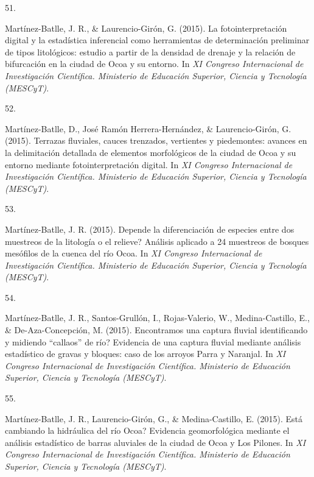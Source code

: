 \documentclass[10pt,a4paper,]{article}
\newlength{\cslhangindent}
\newlength{\csllabelwidth}
\newcommand{\CSLLeftMargin}[1]{\parbox[t]{\csllabelwidth}{\hfill #1~}}
\newcommand{\CSLRightInline}[1]{\parbox[t]{\linewidth - \cslhangindent - \csllabelwidth}{#1}\vspace{0.8ex}}
\begin{document}
\leavevmode\hypertarget{ref-Jose_Ramon_Martinez-Batlle_108049160}{}%
\CSLLeftMargin{51. }
\CSLRightInline{Martínez-Batlle, J. R., \& Laurencio-Girón, G. (2015).
La fotointerpretación digital y la estadística inferencial como
herramientas de determinación preliminar de tipos litológicos: estudio a
partir de la densidad de drenaje y la relación de bifurcación en la
ciudad de Ocoa y su entorno. In \emph{XI Congreso Internacional de
Investigación Científica. Ministerio de Educación Superior, Ciencia y
Tecnología (MESCyT)}.}

\leavevmode\hypertarget{ref-Jose_Ramon_Martinez-Batlle_108049302}{}%
\CSLLeftMargin{52. }
\CSLRightInline{Martínez-Batlle, D., José Ramón Herrera-Hernández, \&
Laurencio-Girón, G. (2015). Terrazas fluviales, cauces trenzados,
vertientes y piedemontes: avances en la delimitación detallada de
elementos morfológicos de la ciudad de Ocoa y su entorno mediante
fotointerpretación digital. In \emph{XI Congreso Internacional de
Investigación Científica. Ministerio de Educación Superior, Ciencia y
Tecnología (MESCyT)}.}

\leavevmode\hypertarget{ref-Jose_Ramon_Martinez-Batlle_108053251}{}%
\CSLLeftMargin{53. }
\CSLRightInline{Martínez-Batlle, J. R. (2015). Depende la diferenciación
de especies entre dos muestreos de la litología o el relieve? Análisis
aplicado a 24 muestreos de bosques mesófilos de la cuenca del río Ocoa.
In \emph{XI Congreso Internacional de Investigación Científica.
Ministerio de Educación Superior, Ciencia y Tecnología (MESCyT)}.}

\leavevmode\hypertarget{ref-Jose_Ramon_Martinez-Batlle_108049360}{}%
\CSLLeftMargin{54. }
\CSLRightInline{Martínez-Batlle, J. R., Santos-Grullón, I.,
Rojas-Valerio, W., Medina-Castillo, E., \& De-Aza-Concepción, M. (2015).
Encontramos una captura fluvial identificando y midiendo {``callaos''}
de río? Evidencia de una captura fluvial mediante análisis estadístico
de gravas y bloques: caso de los arroyos Parra y Naranjal. In \emph{XI
Congreso Internacional de Investigación Científica. Ministerio de
Educación Superior, Ciencia y Tecnología (MESCyT)}.}

\leavevmode\hypertarget{ref-Jose_Ramon_Martinez-Batlle_108050134}{}%
\CSLLeftMargin{55. }
\CSLRightInline{Martínez-Batlle, J. R., Laurencio-Girón, G., \&
Medina-Castillo, E. (2015). Está cambiando la hidráulica del río Ocoa?
Evidencia geomorfológica mediante el análisis estadístico de barras
aluviales de la ciudad de Ocoa y Los Pilones. In \emph{XI Congreso
Internacional de Investigación Científica. Ministerio de Educación
Superior, Ciencia y Tecnología (MESCyT)}.}
\end{document}

